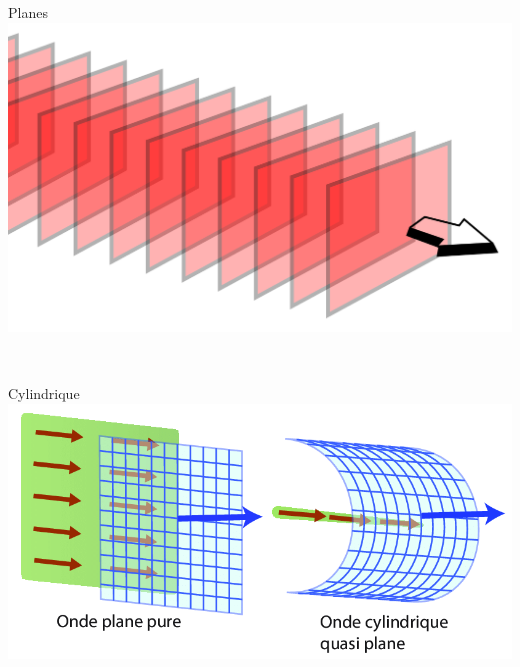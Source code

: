 \documentclass[12pt]{book}
\begin{document}
            \begin{minipage}{0.49\linewidth}
                Planes \\
                \includegraphics[width =\linewidth]{pic/Plane.png}
            \end{minipage}\\
            \begin{minipage}{0.49\linewidth}
                Cylindrique \\
                \includegraphics[width =\linewidth]{pic/cylindrique.png}
            \end{minipage}
\end{document}
